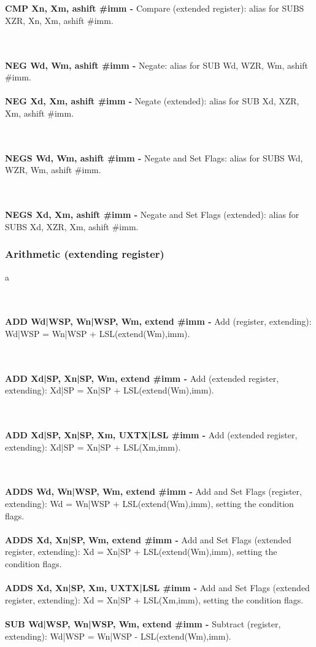 \documentclass[12pt,a4paper,utf8]{ppgsi}
\begin{document}
\\\\\textbf{CMP Xn, Xm{, ashift #imm} -} Compare (extended register): alias for SUBS XZR, Xn, Xm{, ashift #imm}. 

\\\\\textbf{NEG Wd, Wm{, ashift #imm} -} Negate: alias for SUB Wd, WZR, Wm{, ashift #imm}. 
\\\\\textbf{NEG Xd, Xm{, ashift #imm} -} Negate (extended): alias for SUB Xd, XZR, Xm{, ashift #imm}. 

\\\\\textbf{NEGS Wd, Wm{, ashift #imm} -} Negate and Set Flags: alias for SUBS Wd, WZR, Wm{, ashift #imm}. 

\\\\\textbf{NEGS Xd, Xm{, ashift #imm} -} Negate and Set Flags (extended): alias for SUBS Xd, XZR, Xm{, ashift #imm}. 



\subsubsection{Arithmetic (extending register)}
a

\\\\\textbf{ADD Wd|WSP, Wn|WSP, Wm, extend {#imm} -} Add (register, extending): Wd|WSP = Wn|WSP + LSL(extend(Wm),imm). 

\\\\\textbf{ADD Xd|SP, Xn|SP, Wm, extend {#imm} -} Add (extended register, extending): Xd|SP = Xn|SP + LSL(extend(Wm),imm). 

\\\\\textbf{ADD Xd|SP, Xn|SP, Xm{, UXTX|LSL #imm} -} Add (extended register, extending): Xd|SP = Xn|SP + LSL(Xm,imm). 

\\\\\textbf{ADDS Wd, Wn|WSP, Wm, extend {#imm} -} Add and Set Flags (register, extending): Wd = Wn|WSP + LSL(extend(Wm),imm), setting the
condition flags. 
\\\\\textbf{ADDS Xd, Xn|SP, Wm, extend {#imm} -} Add and Set Flags (extended register, extending): Xd = Xn|SP + LSL(extend(Wm),imm), setting
the condition flags. 
\\\\\textbf{ADDS Xd, Xn|SP, Xm{, UXTX|LSL #imm} -} Add and Set Flags (extended register, extending): Xd = Xn|SP + LSL(Xm,imm), setting the condition
flags. 
\\\\\textbf{SUB Wd|WSP, Wn|WSP, Wm, extend {#imm} -} Subtract (register, extending): Wd|WSP = Wn|WSP - LSL(extend(Wm),imm).
\end{document}
